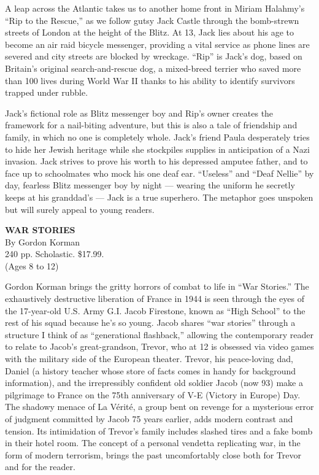 A leap across the Atlantic takes us to another home front in Miriam
Halahmy's ``Rip to the Rescue,'' as we follow gutsy Jack Castle through
the bomb-strewn streets of London at the height of the Blitz. At 13,
Jack lies about his age to become an air raid bicycle messenger,
providing a vital service as phone lines are severed and city streets
are blocked by wreckage. ``Rip'' is Jack's dog, based on Britain's
original search-and-rescue dog, a mixed-breed terrier who saved more
than 100 lives during World War II thanks to his ability to identify
survivors trapped under rubble.

Jack's fictional role as Blitz messenger boy and Rip's owner creates the
framework for a nail-biting adventure, but this is also a tale of
friendship and family, in which no one is completely whole. Jack's
friend Paula desperately tries to hide her Jewish heritage while she
stockpiles supplies in anticipation of a Nazi invasion. Jack strives to
prove his worth to his depressed amputee father, and to face up to
schoolmates who mock his one deaf ear. ``Useless'' and ``Deaf Nellie''
by day, fearless Blitz messenger boy by night --- wearing the uniform he
secretly keeps at his granddad's --- Jack is a true superhero. The
metaphor goes unspoken but will surely appeal to young readers.

\textbf{WAR STORIES}\\
By Gordon Korman\\
240 pp. Scholastic. \$17.99.\\
(Ages 8 to 12)

Gordon Korman brings the gritty horrors of combat to life in ``War
Stories.'' The exhaustively destructive liberation of France in 1944 is
seen through the eyes of the 17-year-old U.S. Army G.I. Jacob Firestone,
known as ``High School'' to the rest of his squad because he's so young.
Jacob shares ``war stories'' through a structure I think of as
``generational flashback,'' allowing the contemporary reader to relate
to Jacob's great-grandson, Trevor, who at 12 is obsessed via video games
with the military side of the European theater. Trevor, his peace-loving
dad, Daniel (a history teacher whose store of facts comes in handy for
background information), and the irrepressibly confident old soldier
Jacob (now 93) make a pilgrimage to France on the 75th anniversary of
V-E (Victory in Europe) Day. The shadowy menace of La Vérité, a group
bent on revenge for a mysterious error of judgment committed by Jacob 75
years earlier, adds modern contrast and tension. Its intimidation of
Trevor's family includes slashed tires and a fake bomb in their hotel
room. The concept of a personal vendetta replicating war, in the form of
modern terrorism, brings the past uncomfortably close both for Trevor
and for the reader.

